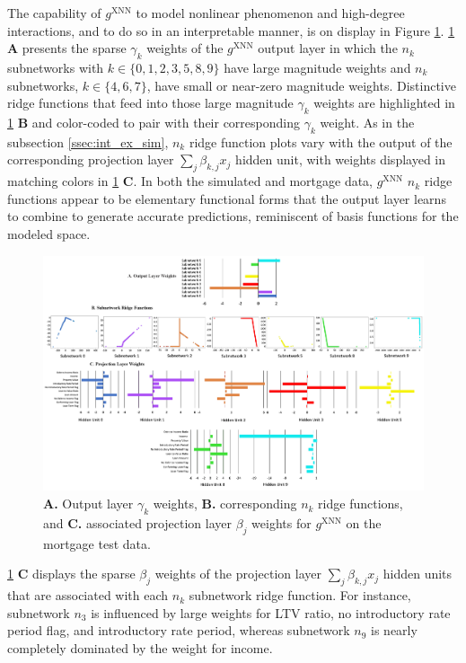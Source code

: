 \documentclass[information,article,submit,moreauthors,pdftex]{definitions/mdpi}
\begin{document}
The capability of $g^\text{XNN}$ to model nonlinear phenomenon and high-degree interactions, and to do so in an interpretable manner, is on display in Figure \ref{fig:mort_xnn_glob_ridge}. \ref{fig:mort_xnn_glob_ridge} \textbf{A} presents the sparse $\gamma_k$ weights of the $g^\text{XNN}$ output layer in which the $n_k$ subnetworks with $k \in \{0,1,2,3,5,8,9\}$ have large magnitude weights and $n_k$ subnetworks, $k \in \{4,6,7\}$, have small or near-zero magnitude weights. Distinctive ridge functions that feed into those large magnitude $\gamma_k$ weights are highlighted in \ref{fig:mort_xnn_glob_ridge} \textbf{B} and color-coded to pair with their corresponding $\gamma_k$ weight. As in the subsection \ref{ssec:int_ex_sim}, $n_k$ ridge function plots vary with the output of the corresponding projection layer $\sum_j\beta_{k,j}x_j$ hidden unit, with weights displayed in matching colors in \ref{fig:mort_xnn_glob_ridge} \textbf{C}. In both the simulated and mortgage data, $g^\text{XNN}$ $n_k$ ridge functions appear to be elementary functional forms that the output layer learns to combine to generate accurate predictions, reminiscent of basis functions for the modeled space.  

\begin{figure}[H]
\centering
\includegraphics[width=16cm]{img/mort_xnn_glob_ridge.png}
\caption{\textbf{A.} Output layer $\gamma_k$ weights, \textbf{B.} corresponding $n_k$ ridge functions, and \textbf{C.} associated projection layer $\beta_j$ weights for $g^\text{XNN}$ on the mortgage test data.}
\label{fig:mort_xnn_glob_ridge}
\end{figure}   

\noindent \ref{fig:mort_xnn_glob_ridge} \textbf{C} displays the sparse $\beta_j$ weights of the projection layer $\sum_j\beta_{k,j}x_j$ hidden units that are associated with each $n_k$ subnetwork ridge function. For instance, subnetwork $n_3$ is influenced by large weights for LTV ratio, no introductory rate period flag, and introductory rate period, whereas subnetwork $n_9$ is nearly completely dominated by the weight for income. 
\end{document}
